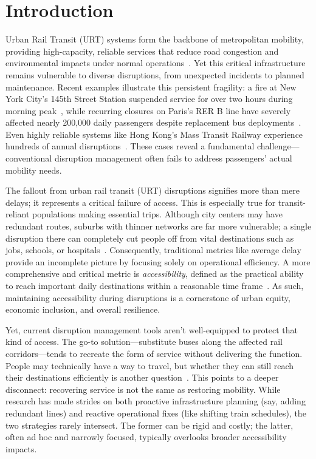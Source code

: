 \documentclass[3p,times,procedia]{elsarticle}
\begin{document}
\vspace*{-12pt}
\section{Introduction}

Urban Rail Transit (URT) systems form the backbone of metropolitan mobility, providing high-capacity, reliable services that reduce road congestion and environmental impacts under normal operations~\citep{tan2020evacuating}. Yet this critical infrastructure remains vulnerable to diverse disruptions, from unexpected incidents to planned maintenance. Recent examples illustrate this persistent fragility: a fire at New York City's 145th Street Station suspended service for over two hours during morning peak~\citep{barone2017abcdfire}, while recurring closures on Paris's RER B line have severely affected nearly 200,000 daily passengers despite replacement bus deployments~\citep{actu2024travaux}. Even highly reliable systems like Hong Kong's Mass Transit Railway experience hundreds of annual disruptions~\citep{zhang2020metro}. These cases reveal a fundamental challenge—conventional disruption management often fails to address passengers' actual mobility needs.

The fallout from urban rail transit (URT) disruptions signifies more than mere delays; it represents a critical failure of access. This is especially true for transit-reliant populations making essential trips. Although city centers may have redundant routes, suburbs with thinner networks are far more vulnerable; a single disruption there can completely cut people off from vital destinations such as jobs, schools, or hospitals~\citep{liu2024measuring}. Consequently, traditional metrics like average delay provide an incomplete picture by focusing solely on operational efficiency. A more comprehensive and critical metric is \emph{accessibility}, defined as the practical ability to reach important daily destinations within a reasonable time frame~\citep{miller2020measuring}. As such, maintaining accessibility during disruptions is a cornerstone of urban equity, economic inclusion, and overall resilience.

Yet, current disruption management tools aren’t well-equipped to protect that kind of access. The go-to solution—substitute buses along the affected rail corridors—tends to recreate the form of service without delivering the function. People may technically have a way to travel, but whether they can still reach their destinations efficiently is another question~\citep{ieda1995commuter}. This points to a deeper disconnect: recovering service is not the same as restoring mobility. While research has made strides on both proactive infrastructure planning (say, adding redundant lines) and reactive operational fixes (like shifting train schedules), the two strategies rarely intersect. The former can be rigid and costly; the latter, often ad hoc and narrowly focused, typically overlooks broader accessibility impacts.
\end{document}
